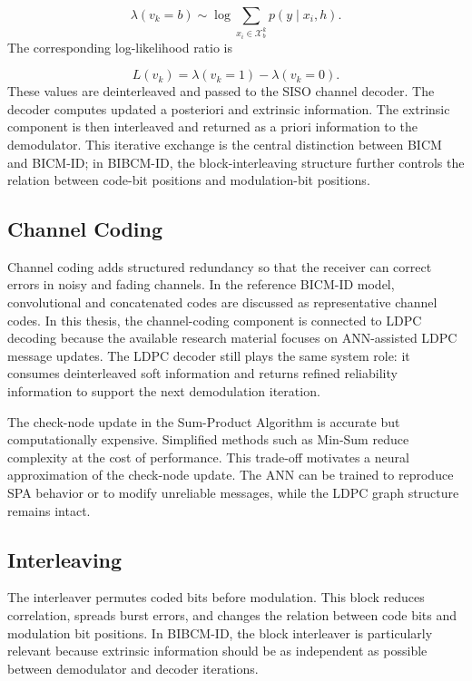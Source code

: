 \begin{equation}
\lambda(v_k=b)\sim\log\sum_{x_i\in\mathcal{X}_b^k}p(y\mid x_i,h).
\end{equation}
The corresponding log-likelihood ratio is

\begin{equation}
L(v_k)=\lambda(v_k=1)-\lambda(v_k=0).
\end{equation}
These values are deinterleaved and passed to the SISO channel decoder. The decoder computes updated a posteriori and extrinsic information. The extrinsic component is then interleaved and returned as a priori information to the demodulator. This iterative exchange is the central distinction between BICM and BICM-ID; in BIBCM-ID, the block-interleaving structure further controls the relation between code-bit positions and modulation-bit positions.

\subsection{Channel Coding}
Channel coding adds structured redundancy so that the receiver can correct errors in noisy and fading channels. In the reference BICM-ID model, convolutional and concatenated codes are discussed as representative channel codes. In this thesis, the channel-coding component is connected to LDPC decoding because the available research material focuses on ANN-assisted LDPC message updates. The LDPC decoder still plays the same system role: it consumes deinterleaved soft information and returns refined reliability information to support the next demodulation iteration.

The check-node update in the Sum-Product Algorithm is accurate but computationally expensive. Simplified methods such as Min-Sum reduce complexity at the cost of performance. This trade-off motivates a neural approximation of the check-node update. The ANN can be trained to reproduce SPA behavior or to modify unreliable messages, while the LDPC graph structure remains intact.

\subsection{Interleaving}
The interleaver permutes coded bits before modulation. This block reduces correlation, spreads burst errors, and changes the relation between code bits and modulation bit positions. In BIBCM-ID, the block interleaver is particularly relevant because extrinsic information should be as independent as possible between demodulator and decoder iterations.

